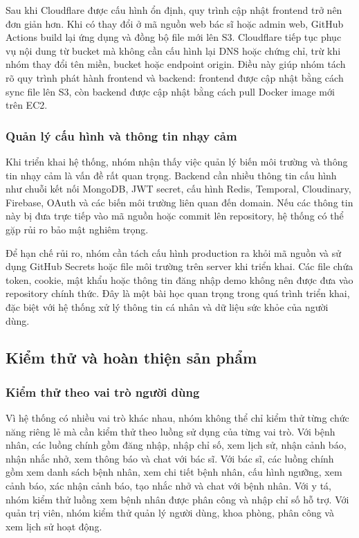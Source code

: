 \par Sau khi Cloudflare được cấu hình ổn định, quy trình cập nhật frontend trở nên đơn giản hơn. Khi có thay đổi ở mã nguồn web bác sĩ hoặc admin web, GitHub Actions build lại ứng dụng và đồng bộ file mới lên S3. Cloudflare tiếp tục phục vụ nội dung từ bucket mà không cần cấu hình lại DNS hoặc chứng chỉ, trừ khi nhóm thay đổi tên miền, bucket hoặc endpoint origin. Điều này giúp nhóm tách rõ quy trình phát hành frontend và backend: frontend được cập nhật bằng cách sync file lên S3, còn backend được cập nhật bằng cách pull Docker image mới trên EC2.

\subsubsection{Quản lý cấu hình và thông tin nhạy cảm}
\par Khi triển khai hệ thống, nhóm nhận thấy việc quản lý biến môi trường và thông tin nhạy cảm là vấn đề rất quan trọng. Backend cần nhiều thông tin cấu hình như chuỗi kết nối MongoDB, JWT secret, cấu hình Redis, Temporal, Cloudinary, Firebase, OAuth và các biến môi trường liên quan đến domain. Nếu các thông tin này bị đưa trực tiếp vào mã nguồn hoặc commit lên repository, hệ thống có thể gặp rủi ro bảo mật nghiêm trọng.

\par Để hạn chế rủi ro, nhóm cần tách cấu hình production ra khỏi mã nguồn và sử dụng GitHub Secrets hoặc file môi trường trên server khi triển khai. Các file chứa token, cookie, mật khẩu hoặc thông tin đăng nhập demo không nên được đưa vào repository chính thức. Đây là một bài học quan trọng trong quá trình triển khai, đặc biệt với hệ thống xử lý thông tin cá nhân và dữ liệu sức khỏe của người dùng.

\subsection{Kiểm thử và hoàn thiện sản phẩm}

\subsubsection{Kiểm thử theo vai trò người dùng}
\par Vì hệ thống có nhiều vai trò khác nhau, nhóm không thể chỉ kiểm thử từng chức năng riêng lẻ mà cần kiểm thử theo luồng sử dụng của từng vai trò. Với bệnh nhân, các luồng chính gồm đăng nhập, nhập chỉ số, xem lịch sử, nhận cảnh báo, nhận nhắc nhở, xem thông báo và chat với bác sĩ. Với bác sĩ, các luồng chính gồm xem danh sách bệnh nhân, xem chi tiết bệnh nhân, cấu hình ngưỡng, xem cảnh báo, xác nhận cảnh báo, tạo nhắc nhở và chat với bệnh nhân. Với y tá, nhóm kiểm thử luồng xem bệnh nhân được phân công và nhập chỉ số hỗ trợ. Với quản trị viên, nhóm kiểm thử quản lý người dùng, khoa phòng, phân công và xem lịch sử hoạt động.

